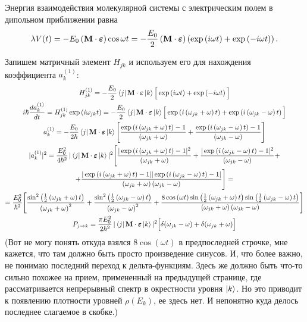 \documentclass[12pt]{article}
\newcommand{\lb}{\left(}
\newcommand{\rb}{\right)}
\newcommand{\mf}{\mathbf}
\newcommand{\vverh}{\vspace*{-0.15cm}}
\begin{document}
Энергия взаимодействия молекулярной системы с электрическим полем в дипольном приближении равна
\vverh
\begin{gather}
	\lambda V(t) = - E_0 \lb \mf{M} \cdot \boldsymbol{\varepsilon} \rb \cos \omega t = - \frac{E_0}{2} \lb \mf{M} \cdot \boldsymbol{\varepsilon} \rb \lb \exp \lb i \omega t \rb + \exp \lb - i \omega t \rb \rb .\notag
\end{gather}

Запишем матричный элемент $H_{jk}$  и используем его для нахождения коэффициента $a_k^{(1)}$:
\vverh
\begin{gather}
	H_{jk}^{(1)} = -\frac{E_0}{2} \bra{j} \mf{M} \cdot \boldsymbol{\varepsilon} \ket{k} \Big[ \exp \lb i \omega t \rb + \exp \lb - i \omega t \rb \Big] \notag \\
	i \hbar \frac{d a_k^{(1)}}{dt} = H_{jk}^{(1)} \exp \lb i \omega_{jk} t \rb = -\frac{E_0}{2} \bra{j} \mf{M} \cdot \boldsymbol{\varepsilon} \ket{k} \Big[ \exp \lb i \lb \omega_{jk} + \omega \rb t \rb + \exp \lb i \lb \omega_{jk} - \omega \rb t \rb \Big] \notag \\
	a_k^{(1)} = - \frac{E_0}{2 \hbar} \bra{j} \mf{M} \cdot \boldsymbol{\varepsilon} \ket{k} \Bigg[ \frac{ \exp \lb i \lb \omega_{jk} + \omega \rb t \rb - 1}{\lb \omega_{jk} + \omega \rb} + \frac{\exp \lb i \lb \omega_{jk} - \omega \rb t \rb - 1}{\lb \omega_{jk} - \omega \rb} \Bigg] \notag \\
	| a_k^{(1)} |^2 = \frac{E_0^2}{4 \hbar^2} \, | \bra{j} \mf{M} \cdot \boldsymbol{\varepsilon} \ket{k} |^2 \Bigg[ \frac{ | \exp \lb i \lb \omega_{jk} + \omega \rb t \rb - 1 |^2 }{\lb \omega_{jk} + \omega \rb } + \frac{| \exp \lb i \lb \omega_{jk} - \omega \rb t \rb  - 1|^2 }{ \lb \omega_{jk} - \omega \rb}+ \notag \\ 
	+ \frac{|\exp \lb i \lb \omega_{jk} + \omega \rb t \rb - 1 | | \exp \lb i \lb \omega_{jk} - \omega \rb t \rb - 1|}{\lb \omega_{jk} + \omega \rb \lb \omega_{jk} - \omega \rb} \Bigg] = \notag \\
	= \frac{E_0^2}{\hbar^2} \Bigg[ \frac{\sin^2 \lb \frac{1}{2} \lb \omega_{jk} + \omega \rb t \rb}{\lb \omega_{jk} + \omega \rb^2} + \frac{ \sin^2 \lb \frac{1}{2} \lb \omega_{jk} - \omega \rb t \rb}{ \lb \omega_{jk} - \omega \rb^2 } + \frac{8 \cos \lb \omega t \rb \sin \lb \frac{1}{2} \lb \omega_{jk} + \omega \rb t \rb \sin \lb \frac{1}{2} \lb \omega_{jk} - \omega \rb t \rb }{ \lb \omega_{jk} + \omega \rb \lb \omega_{jk} - \omega \rb} \Bigg] \notag \\
	P_{j \rightarrow k} = \frac{\pi E_0^2}{2 \hbar^2} \, | \bra{j} \mf{M} \cdot \boldsymbol{\varepsilon} \ket{k} |^2  \Big[ \delta(\omega_{jk} - \omega) + \delta( \omega_{jk} + \omega) \Big] \label{eq:prob}
\end{gather}
(Вот не могу понять откуда взялся $8 \cos \lb \omega t \rb$ в предпоследней строчке, мне кажется, что там должно быть просто произведение синусов. И, что более важно, не понимаю последний переход к дельта-функциям. Здесь же должно быть что-то сильно похожее на прием, примененный на предыдущей странице, где рассматривается непрерывный спектр в окрестности уровня $\ket{k}$. Но это приводит к появлению плотности уровней $\rho (E_k)$, ее здесь нет. И непонятно куда делось последнее слагаемое в скобке.) 
\end{document}
